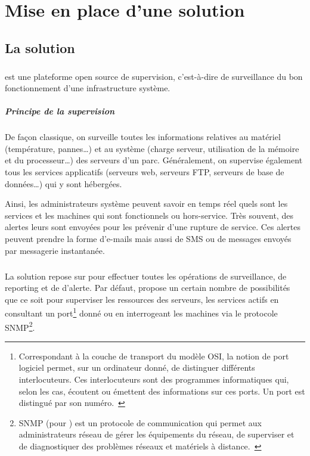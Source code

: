 \chapter{Mise en place d'une solution \acentreon{}}
\label{section:centreon}

\section{La solution \acentreon}

\paragraph{}
\acentreon{} est une plateforme open source de supervision, c'est-à-dire de surveillance du bon fonctionnement d'une infrastructure système.

\paragraph{Principe de la supervision}
De façon classique, on surveille toutes les informations relatives au matériel (température, pannes\ldots) et au système (charge serveur, utilisation de la mémoire et du processeur\ldots) des serveurs d'un parc.
Généralement, on supervise également tous les services applicatifs (serveurs web, serveurs FTP, serveurs de base de données\ldots) qui y sont hébergées.

Ainsi, les administrateurs système peuvent savoir en temps réel quels sont les services et les machines qui sont fonctionnels ou hors-service.
Très souvent, des alertes leurs sont envoyées pour les prévenir d'une rupture de service.
Ces alertes peuvent prendre la forme d'e-mails mais aussi de SMS ou de messages envoyés par messagerie instantanée.

\paragraph{\anagios}
La solution \acentreon{} repose sur \anagios{} pour effectuer toutes les opérations de surveillance, de reporting et de d'alerte.
Par défaut, \anagios{} propose un certain nombre de possibilités que ce soit pour superviser les ressources des serveurs, les services actifs en consultant un port\footnote{Correspondant à la couche de transport du modèle OSI, la notion de port logiciel permet, sur un ordinateur donné, de distinguer différents interlocuteurs. Ces interlocuteurs sont des programmes informatiques qui, selon les cas, écoutent ou émettent des informations sur ces ports. Un port est distingué par son numéro.~\cite{port}} donné ou en interrogeant les machines via le protocole SNMP\footnote{SNMP (pour ) est un protocole de communication qui permet aux administrateurs réseau de gérer les équipements du réseau, de superviser et de diagnostiquer des problèmes réseaux et matériels à distance.~\cite{snmp}}.


